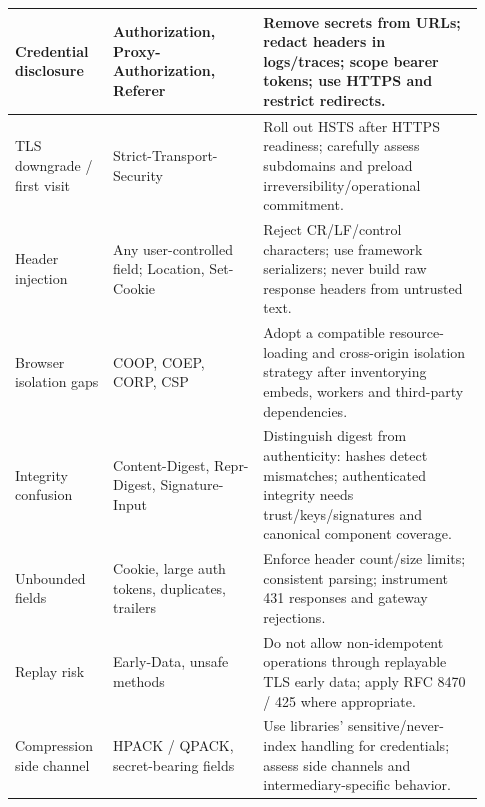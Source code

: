 \documentclass[10pt,letterpaper,oneside]{article}
\newcommand{\field}[1]{{\ttfamily\small\color{Deep}#1}}
\begin{document}
\begin{longtable}{>{\RaggedRight\arraybackslash}p{0.19\linewidth}>{\RaggedRight\arraybackslash}p{0.30\linewidth}>{\RaggedRight\arraybackslash}p{0.44\linewidth}}
Credential disclosure & \field{Authorization}, \field{Proxy-Authorization}, \field{Referer} & Remove secrets from URLs; redact headers in logs/traces; scope bearer tokens; use HTTPS and restrict redirects.\\\midrule
TLS downgrade / first visit & \field{Strict-Transport-Security} & Roll out HSTS after HTTPS readiness; carefully assess subdomains and preload irreversibility/operational commitment.\\\midrule
Header injection & Any user-controlled field; \field{Location}, \field{Set-Cookie} & Reject CR/LF/control characters; use framework serializers; never build raw response headers from untrusted text.\\\midrule
Browser isolation gaps & COOP, COEP, CORP, CSP & Adopt a compatible resource-loading and cross-origin isolation strategy after inventorying embeds, workers and third-party dependencies.\\\midrule
Integrity confusion & \field{Content-Digest}, \field{Repr-Digest}, \field{Signature-Input} & Distinguish digest from authenticity: hashes detect mismatches; authenticated integrity needs trust/keys/signatures and canonical component coverage.\\\midrule
Unbounded fields & \field{Cookie}, large auth tokens, duplicates, trailers & Enforce header count/size limits; consistent parsing; instrument 431 responses and gateway rejections.\\\midrule
Replay risk & \field{Early-Data}, unsafe methods & Do not allow non-idempotent operations through replayable TLS early data; apply RFC 8470 / 425 where appropriate.\\\midrule
Compression side channel & HPACK / QPACK, secret-bearing fields & Use libraries' sensitive/never-index handling for credentials; assess side channels and intermediary-specific behavior.\\\midrule
\bottomrule\end{longtable}
\end{document}
